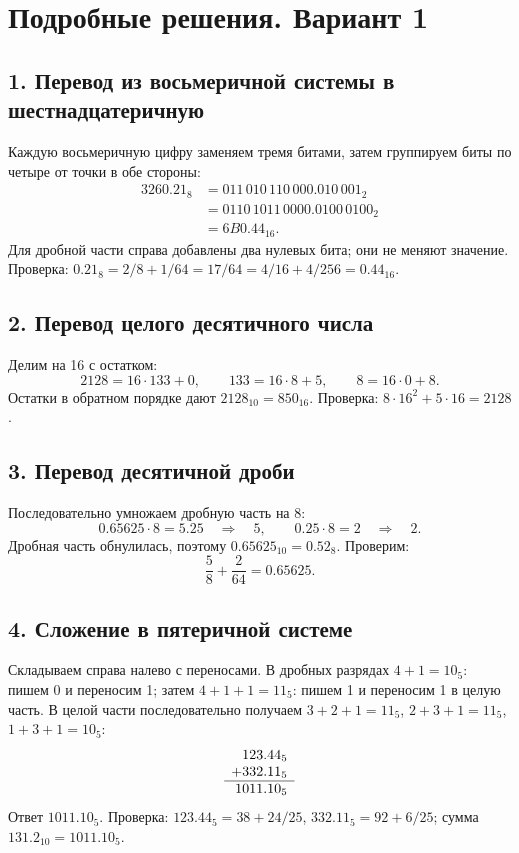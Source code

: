 \section*{Подробные решения. Вариант 1}

\subsection*{1. Перевод из восьмеричной системы в шестнадцатеричную}
Каждую восьмеричную цифру заменяем тремя битами, затем группируем биты по четыре от точки в обе стороны:
\[
\begin{aligned}
3260.21_8
&=011\,010\,110\,000.010\,001_2\\
&=0110\,1011\,0000.0100\,0100_2\\
&=\boxed{6B0.44_{16}}.
\end{aligned}
\]
Для дробной части справа добавлены два нулевых бита; они не меняют значение. Проверка: $0.21_8=2/8+1/64=17/64=4/16+4/256=0.44_{16}$.

\subsection*{2. Перевод целого десятичного числа}
Делим на 16 с остатком:
\[
2128=16\cdot133+0,\qquad
133=16\cdot8+5,\qquad
8=16\cdot0+8.
\]
Остатки в обратном порядке дают $\boxed{2128_{10}=850_{16}}$. Проверка: $8\cdot16^2+5\cdot16=2128$.

\subsection*{3. Перевод десятичной дроби}
Последовательно умножаем дробную часть на 8:
\[
0.65625\cdot8=5.25\quad\Rightarrow\quad5,\qquad
0.25\cdot8=2\quad\Rightarrow\quad2.
\]
Дробная часть обнулилась, поэтому $\boxed{0.65625_{10}=0.52_8}$. Проверим:
\[
\frac58+\frac{2}{64}=0.65625.
\]

\subsection*{4. Сложение в пятеричной системе}
Складываем справа налево с переносами. В дробных разрядах $4+1=10_5$: пишем 0 и переносим 1; затем $4+1+1=11_5$: пишем 1 и переносим 1 в целую часть. В целой части последовательно получаем $3+2+1=11_5$, $2+3+1=11_5$, $1+3+1=10_5$:
\[
\begin{array}{r@{}l}
  123&.44_5\\
+ 332&.11_5\\ \hline
 1011&.10_5
\end{array}
\]
Ответ $\boxed{1011.10_5}$. Проверка: $123.44_5=38+24/25$, $332.11_5=92+6/25$; сумма $131.2_{10}=1011.10_5$.

